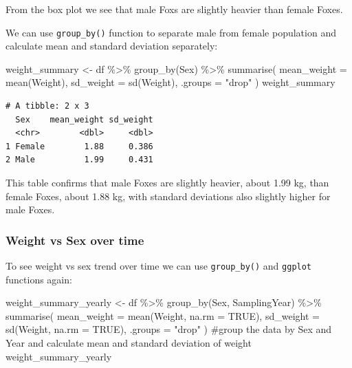 \documentclass[
  letterpaper,
]{report}
\newenvironment{Shaded}{\begin{snugshade}}{\end{snugshade}}
\newcommand{\AttributeTok}[1]{\textcolor[rgb]{0.40,0.45,0.13}{#1}}
\newcommand{\CommentTok}[1]{\textcolor[rgb]{0.37,0.37,0.37}{#1}}
\newcommand{\ConstantTok}[1]{\textcolor[rgb]{0.56,0.35,0.01}{#1}}
\newcommand{\FunctionTok}[1]{\textcolor[rgb]{0.28,0.35,0.67}{#1}}
\newcommand{\NormalTok}[1]{\textcolor[rgb]{0.00,0.23,0.31}{#1}}
\newcommand{\OtherTok}[1]{\textcolor[rgb]{0.00,0.23,0.31}{#1}}
\newcommand{\SpecialCharTok}[1]{\textcolor[rgb]{0.37,0.37,0.37}{#1}}
\newcommand{\StringTok}[1]{\textcolor[rgb]{0.13,0.47,0.30}{#1}}
\begin{document}
From the box plot we see that male Foxs are slightly heavier than female
Foxes.

We can use \texttt{group\_by()} function to separate male from female
population and calculate mean and standard deviation separately:

\begin{Shaded}
\begin{Highlighting}[]
\NormalTok{weight\_summary }\OtherTok{\textless{}{-}}\NormalTok{ df }\SpecialCharTok{\%\textgreater{}\%}
  \FunctionTok{group\_by}\NormalTok{(Sex) }\SpecialCharTok{\%\textgreater{}\%}
  \FunctionTok{summarise}\NormalTok{(}
    \AttributeTok{mean\_weight =} \FunctionTok{mean}\NormalTok{(Weight),}
    \AttributeTok{sd\_weight =} \FunctionTok{sd}\NormalTok{(Weight),}
    \AttributeTok{.groups =} \StringTok{"drop"}
\NormalTok{  )}
\NormalTok{weight\_summary}
\end{Highlighting}
\end{Shaded}

\begin{verbatim}
# A tibble: 2 x 3
  Sex    mean_weight sd_weight
  <chr>        <dbl>     <dbl>
1 Female        1.88     0.386
2 Male          1.99     0.431
\end{verbatim}

This table confirms that male Foxes are slightly heavier, about 1.99 kg,
than female Foxes, about 1.88 kg, with standard deviations also slightly
higher for male Foxes.

\subsubsection{Weight vs Sex over time}\label{weight-vs-sex-over-time}

To see weight vs sex trend over time we can use \texttt{group\_by()} and
\texttt{ggplot} functions again:

\begin{Shaded}
\begin{Highlighting}[]
\NormalTok{weight\_summary\_yearly }\OtherTok{\textless{}{-}}\NormalTok{ df }\SpecialCharTok{\%\textgreater{}\%}
  \FunctionTok{group\_by}\NormalTok{(Sex, SamplingYear) }\SpecialCharTok{\%\textgreater{}\%}
  \FunctionTok{summarise}\NormalTok{(}
    \AttributeTok{mean\_weight =} \FunctionTok{mean}\NormalTok{(Weight, }\AttributeTok{na.rm =} \ConstantTok{TRUE}\NormalTok{),}
    \AttributeTok{sd\_weight =} \FunctionTok{sd}\NormalTok{(Weight, }\AttributeTok{na.rm =} \ConstantTok{TRUE}\NormalTok{),}
    \AttributeTok{.groups =} \StringTok{"drop"}
\NormalTok{  ) }\CommentTok{\#group the data by Sex and Year and calculate mean and standard deviation of weight}
\NormalTok{weight\_summary\_yearly}
\end{Highlighting}
\end{Shaded}
\end{document}
